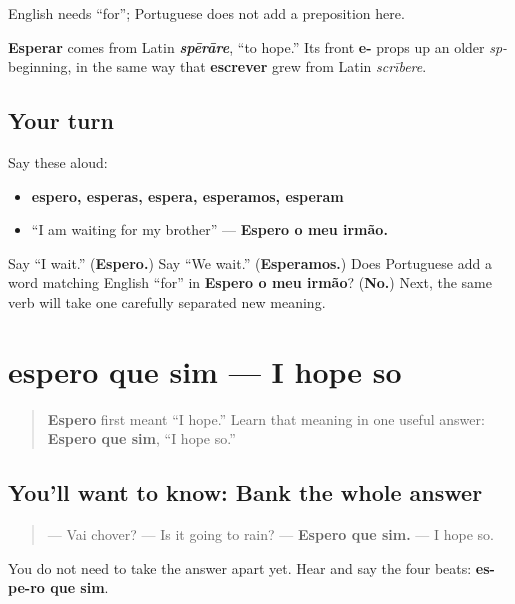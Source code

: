 English needs “for”; Portuguese does not add a preposition here.

\begin{cousinweb}
\textbf{Esperar} comes from Latin \emph{\textbf{spērāre}}, “to hope.” Its front \textbf{e-} props up an older \emph{sp-} beginning, in the same way that \textbf{escrever} grew from Latin \emph{scrībere}.
\end{cousinweb}

\subsection*{Your turn}
Say these aloud:

\begin{itemize}
\raggedright
  \item \textbf{espero, esperas, espera, esperamos, esperam}
  \item “I am waiting for my brother” — \textbf{Espero o meu irmão.}
\end{itemize}

\begin{tcolorbox}[breakable,colback=teal!4,colframe=teal!35!black,title={Before you move on}]
Say “I wait.” (\textbf{Espero.}) Say “We wait.” (\textbf{Esperamos.}) Does Portuguese add a word matching English “for” in \textbf{Espero o meu irmão}? (\textbf{No.}) Next, the same verb will take one carefully separated new meaning.
\end{tcolorbox}
\section[espero que sim]{espero que sim — I hope so}

\label{lesson:PT-C21-esperar-hope}



\begin{quote}
\textbf{Espero} first meant “I hope.” Learn that meaning in one useful answer: \textbf{Espero que sim}, “I hope so.”
\end{quote}

\subsection*{You'll want to know: Bank the whole answer}
\begin{quote}
— Vai chover? — Is it going to rain? — \textbf{Espero que sim.} — I hope so.
\end{quote}

You do not need to take the answer apart yet. Hear and say the four beats: \textbf{es-pe-ro que sim}.

